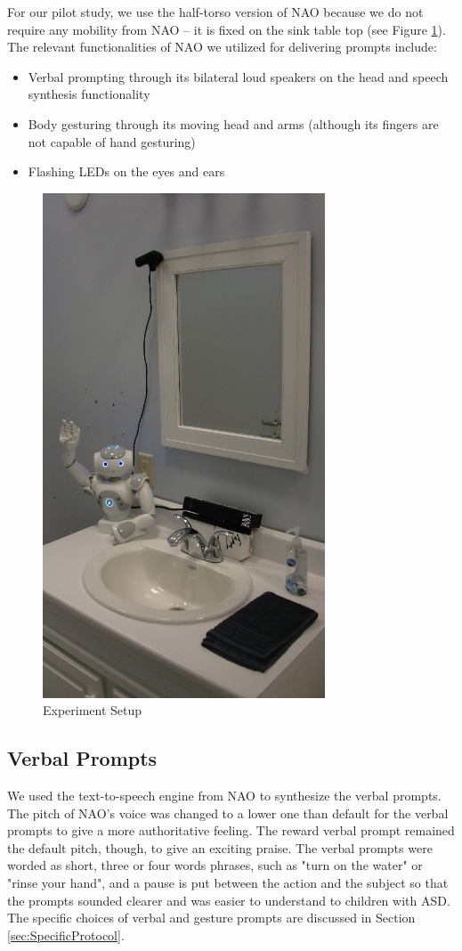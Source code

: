 For our pilot study, we use the half-torso version of NAO because we do not require any mobility from NAO -- it is fixed on the sink table top (see Figure \ref{fig:ExpSetup}).  The relevant functionalities of NAO we utilized for delivering prompts include:
\begin{itemize}
	\item Verbal prompting through its bilateral loud speakers on the head and speech synthesis functionality
	\item Body gesturing through its moving head and arms (although its fingers are not capable of hand gesturing)
	\item Flashing LEDs on the eyes and ears
\end{itemize}
\begin{figure} [h]
	\centering
	\includegraphics[height=15cm, keepaspectratio]{./img/exp_setup.jpg}
	\caption{Experiment Setup}
	\label{fig:ExpSetup}
\end{figure}


\subsection{Verbal Prompts}
We used the text-to-speech engine from NAO to synthesize the verbal prompts.  The pitch of NAO's voice was changed to a lower one than default for the verbal prompts to give a more authoritative feeling.  The reward verbal prompt remained the default pitch, though, to give an exciting praise.  The verbal prompts were worded as short, three or four words phrases, such as "turn on the water" or "rinse your hand", and a pause is put between the action and the subject so that the prompts sounded clearer and was easier to understand to children with ASD.  The specific choices of verbal and gesture prompts are discussed in Section \ref{sec:SpecificProtocol}.

